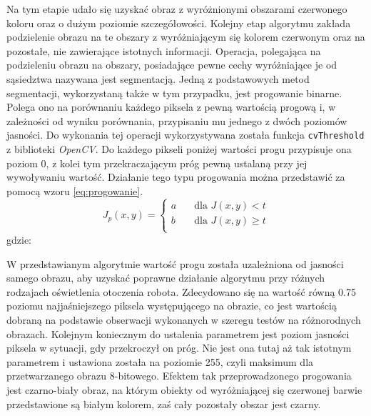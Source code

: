 Na tym etapie udało się uzyskać obraz z wyróżnionymi obszarami czerwonego koloru oraz o dużym poziomie szczegółowości. Kolejny etap algorytmu zakłada podzielenie obrazu na te obszary z wyróżniającym się kolorem czerwonym oraz na pozostałe, nie zawierające istotnych informacji. Operacja, polegająca na podzieleniu obrazu na obszary, posiadające pewne cechy wyróżniające je od sąsiedztwa nazywana jest segmentacją\cite{Malina}. Jedną z podstawowych metod segmentacji, wykorzystaną także w tym przypadku, jest progowanie binarne. Polega ono na porównaniu każdego piksela z pewną wartością progową i, w zależności od wyniku porównania, przypisaniu mu jednego z dwóch poziomów jasności. Do wykonania tej operacji wykorzystywana została funkcja \texttt{cvThreshold} z biblioteki \textit{OpenCV}. Do każdego pikseli poniżej wartości progu przypisuje ona poziom 0, z kolei tym przekraczającym próg pewną ustalaną przy jej wywoływaniu wartość. Działanie tego typu progowania można przedstawić za pomocą wzoru \ref{eq:progowanie}.
\begin{equation}
J_p(x, y) =
  \begin{cases}
    a	& \quad \text{dla } J(x, y) < t\\
    b	& \quad \text{dla } J(x, y) \geq t\\
  \end{cases}
\label{eq:progowanie}
\end{equation}
gdzie:
\begin{equationDescriptor}
\end{equationDescriptor}
W przedstawianym algorytmie wartość progu została uzależniona od jasności samego obrazu, aby uzyskać poprawne działanie algorytmu przy różnych rodzajach oświetlenia otoczenia robota. Zdecydowano się na wartość równą 0.75 poziomu najjaśniejszego piksela występującego na obrazie, co jest wartością dobraną na podstawie obserwacji wykonanych w szeregu testów na różnorodnych obrazach. Kolejnym koniecznym do ustalenia parametrem jest poziom jasności piksela w sytuacji, gdy przekroczył on próg. Nie jest ona tutaj aż tak istotnym parametrem i ustawiona została na poziomie 255, czyli maksimum dla przetwarzanego obrazu 8-bitowego. Efektem tak przeprowadzonego progowania jest czarno-biały obraz, na którym obiekty od wyróżniającej się czerwonej barwie przedstawione są białym kolorem, zaś cały pozostały obszar jest czarny.

